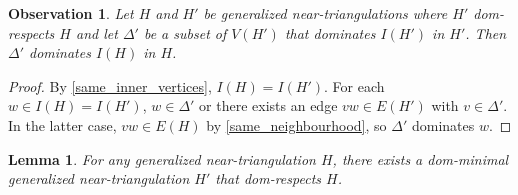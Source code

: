 \documentclass{article}
\newtheorem{obs}{Observation}
\newtheorem{lem}{Lemma}
\theoremstyle{definition}
\begin{document}
\begin{obs}
  Let $H$ and $H'$ be generalized near-triangulations where $H'$ dom-respects $H$ and let $\Delta'$ be a subset of $V(H')$ that dominates $I(H')$ in $H'$.  Then $\Delta'$ dominates $I(H)$ in $H$.
\end{obs}

\begin{proof}
  By \cref{same_inner_vertices}, $I(H)=I(H')$. For each $w\in I(H)=I(H')$, $w\in \Delta'$ or there exists an edge $vw\in E(H')$ with $v\in\Delta'$.  In the latter case, $vw\in E(H)$ by \cref{same_neighbourhood}, so $\Delta'$ dominates $w$.
\end{proof}

\begin{lem}\label{dom_minimal}
  For any generalized near-triangulation $H$, there exists a dom-minimal generalized near-triangulation $H'$ that dom-respects $H$.
\end{lem}
\end{document}
